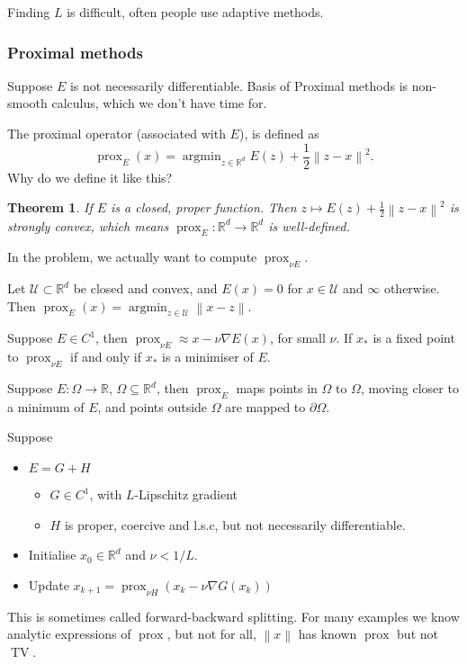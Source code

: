 \documentclass[12pt]{article}
\newtheorem{theorem}{Theorem}[section]
\theoremstyle{definition}
\newcommand{\real}{\mathbb{R}}   %
\DeclareMathOperator{\argmin}{argmin}
\DeclareMathOperator{\prox}{prox}
\DeclareMathOperator{\TV}{TV}
\newcommand\norm[1]{\left\lVert#1\right\rVert}
\begin{document}
Finding $L$ is difficult, often people use adaptive methods. 

\subsubsection{Proximal methods}
Suppose $E$ is not necessarily differentiable. Basis of Proximal methods is non-smooth calculus, which we don't have time for.

The proximal operator (associated with $E$), is defined as 
\begin{equation*}
    \prox_E(x) = \argmin_{z\in\real^d} E(z) + \frac{1}{2}\norm{z-x}^2.
\end{equation*}
Why do we define it like this?
\begin{theorem}
    If $E$ is a closed, proper function. Then $z\mapsto E(z) + \frac{1}{2}\norm{z-x}^2$ is strongly convex, which means $\prox_E:\real^d\to\real^d$ is well-defined.
\end{theorem}
In the problem, we actually want to compute $\prox_{\nu E}$. 

Let $\mathcal{U}\subset \real^d$ be closed and convex, and $E(x) = 0$ for $x\in \mathcal{U}$ and $\infty$ otherwise. Then $\prox_E(x) = \argmin_{z\in \mathcal{U}} \norm{x-z}$. 

Suppose $E\in C^1$, then $\prox_{\nu E} \approx x- \nu \nabla E(x)$, for small $\nu$. If $x_*$ is a fixed point to $\prox_{\nu E}$ if and only if $x_*$ is a minimiser of $E$. 

Suppose $E:\Omega\to\real$, $\Omega\subseteq \real^d$, then $\prox_E$ maps points in $\Omega$ to $\Omega$, moving closer to a minimum of $E$, and points outside $\Omega$ are mapped to $\partial \Omega$. 

Suppose 
\begin{itemize}
    \item $E=G+H$
    \begin{itemize}
        \item $G\in C^1$, with $L$-Lipschitz gradient
        \item $H$ is proper, coercive and l.s.c, but not necessarily differentiable.
    \end{itemize}
    \item Initialise $x_0\in\real^d$ and $\nu<1/L$.
    \item Update $x_{k+1} = \prox_{\nu H}(x_k - \nu \nabla G(x_k))$
\end{itemize}

This is sometimes called forward-backward splitting.
For many examples we know analytic expressions of $\prox$, but not for all, $\norm{x}$ has known $\prox$ but not $\TV$.
\end{document}
